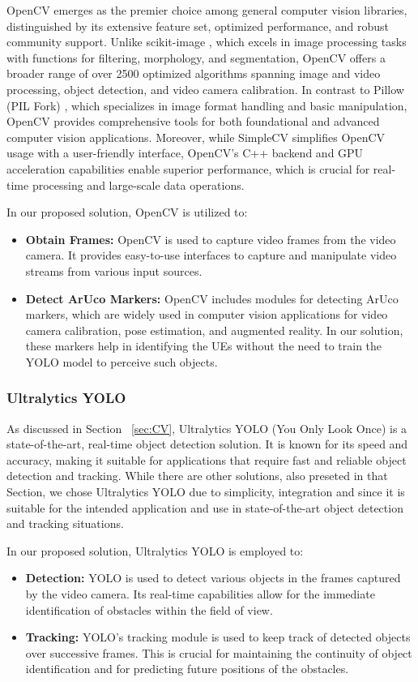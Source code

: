OpenCV emerges as the premier choice among general computer vision libraries, distinguished by its extensive feature set, optimized performance, and robust community support.
Unlike scikit-image \cite{}, which excels in image processing tasks with functions for filtering, morphology, and segmentation, OpenCV offers a broader range of over 2500 optimized algorithms spanning image and video processing, object detection, and video camera calibration.
In contrast to Pillow (PIL Fork) \cite{}, which specializes in image format handling and basic manipulation, OpenCV provides comprehensive tools for both foundational and advanced computer vision applications.
Moreover, while SimpleCV \cite{} simplifies OpenCV usage with a user-friendly interface, OpenCV's C++ backend and GPU acceleration capabilities enable superior performance, which is crucial for real-time processing and large-scale data operations.

In our proposed solution, OpenCV is utilized to:
\begin{itemize}
    \item \textbf{Obtain Frames:} OpenCV is used to capture video frames from the video camera.
    It provides easy-to-use interfaces to capture and manipulate video streams from various input sources.
    \item \textbf{Detect ArUco Markers:} OpenCV includes modules for detecting ArUco markers, which are widely used in computer vision applications for video camera calibration, pose estimation, and augmented reality.
    In our solution, these markers help in identifying the UEs without the need to train the YOLO model to perceive such objects.
\end{itemize}

\subsubsection{Ultralytics YOLO}
As discussed in Section ~\ref{sec:CV}, Ultralytics YOLO (You Only Look Once) is a state-of-the-art, real-time object detection solution.
It is known for its speed and accuracy, making it suitable for applications that require fast and reliable object detection and tracking.
While there are other solutions, also preseted in that Section, we chose Ultralytics YOLO due to simplicity, integration and since it is suitable for the intended application and use in state-of-the-art object detection and tracking situations.

In our proposed solution, Ultralytics YOLO is employed to:
\begin{itemize}
    \item \textbf{Detection:} YOLO is used to detect various objects in the frames captured by the video camera.
    Its real-time capabilities allow for the immediate identification of obstacles within the field of view.
    \item \textbf{Tracking:} YOLO’s tracking module is used to keep track of detected objects over successive frames.
    This is crucial for maintaining the continuity of object identification and for predicting future positions of the obstacles. %
\end{itemize}

